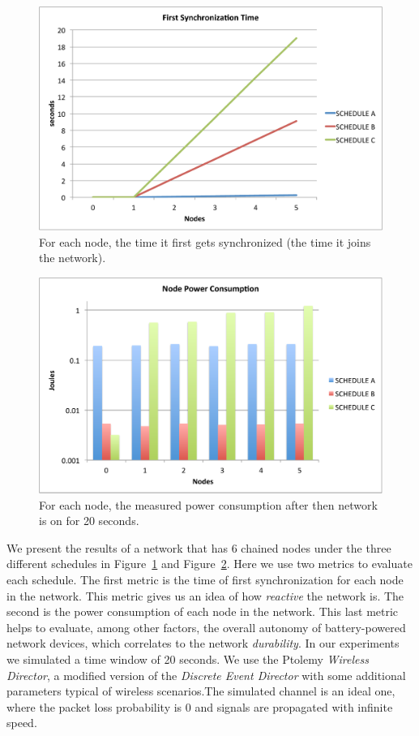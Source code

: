 \begin{figure}[t]
\centering
\includegraphics[width=0.9\columnwidth]{figures/synch_time_sched_big}
\caption{\small For each node, the time it first gets synchronized (the time it joins the network).}
\label{fig:time_sync}
\end{figure}

\begin{figure}[t]
\centering
\includegraphics[width=0.9\columnwidth]{figures/power_cons_big}
\caption{\small For each node, the measured power consumption after then network is on for 20 seconds.}
\label{fig:power_evaluation}
\end{figure}

We present the results of a network that has 6 chained nodes under the three different schedules in Figure~\ref{fig:time_sync} and Figure~\ref{fig:power_evaluation}. Here we use two metrics to evaluate each schedule. The first metric is the time of first synchronization for each node in the network. This metric gives us an idea of how \emph{reactive} the network is. The second is the power consumption of each node in the network. This last metric helps to evaluate, among other factors, the overall autonomy of battery-powered network devices, which correlates to the network {\em durability}.
In our experiments we simulated a time window of 20 seconds. We use the Ptolemy \emph{Wireless Director}, a modified version of the \emph{Discrete Event Director} with some additional parameters typical of wireless scenarios.The simulated channel is an ideal one, where the packet loss probability is 0 and signals are propagated with infinite speed.

